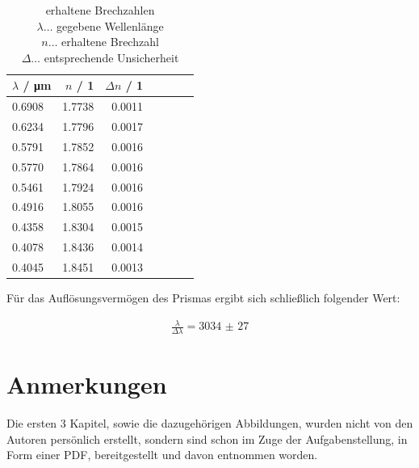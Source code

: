 \documentclass[11pt,ngerman]{scrartcl}
\begin{document}
\begin{table}[H]
	\caption{erhaltene Brechzahlen \\ $\lambda \dots$ gegebene Wellenlänge \\ $n \dots$ erhaltene Brechzahl  \\ $\Delta \dots$ entsprechende Unsicherheit}
	\centering
	\begin{tabular}{lrrrrrr}
		\toprule
		$\lambda$ / \si{\um} & $n$ / 1 & $\Delta n$ / 1 \\
		\midrule
		0.6908               & 1.7738  & 0.0011         \\
		0.6234               & 1.7796  & 0.0017         \\
		0.5791               & 1.7852  & 0.0016         \\
		0.5770               & 1.7864  & 0.0016         \\
		0.5461               & 1.7924  & 0.0016         \\
		0.4916               & 1.8055  & 0.0016         \\
		0.4358               & 1.8304  & 0.0015         \\
		0.4078               & 1.8436  & 0.0014         \\
		0.4045               & 1.8451  & 0.0013         \\
		\bottomrule
	\end{tabular}
\end{table}


Für das Auflösungsvermögen des Prismas ergibt sich schließlich folgender Wert:

\begin{align*}
	\frac{\lambda}{\Delta \lambda} = \num{3034(27)}
\end{align*}



\vspace{5mm}

\section{Anmerkungen}

Die ersten 3 Kapitel, sowie die dazugehörigen Abbildungen, wurden nicht von den
Autoren persönlich erstellt, sondern sind schon im Zuge der Aufgabenstellung,
in Form einer PDF, bereitgestellt und davon entnommen worden. \cite{gitterprismavorlage}

\newpage

\printbibliography
\listoffigures
\listoftables
\end{document}
